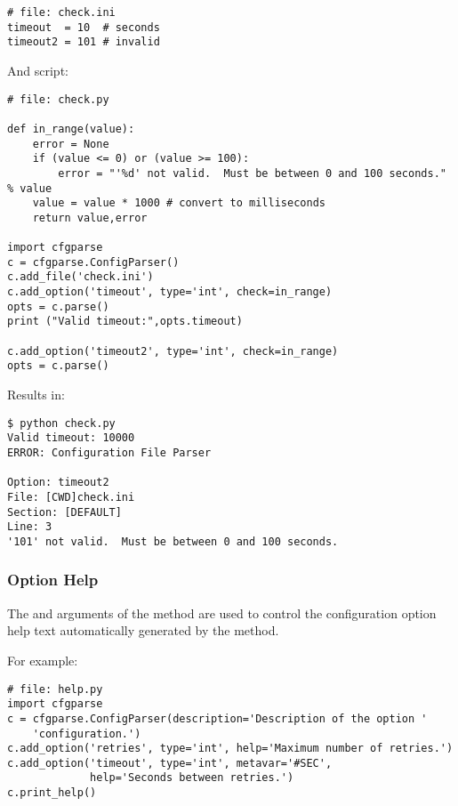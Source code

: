 \documentclass{howto}
\begin{document}
\begin{verbatim}
# file: check.ini
timeout  = 10  # seconds
timeout2 = 101 # invalid
\end{verbatim}

And script:

\begin{verbatim}
# file: check.py

def in_range(value):
    error = None
    if (value <= 0) or (value >= 100):
        error = "'%d' not valid.  Must be between 0 and 100 seconds." % value        
    value = value * 1000 # convert to milliseconds
    return value,error
    
import cfgparse
c = cfgparse.ConfigParser()
c.add_file('check.ini')
c.add_option('timeout', type='int', check=in_range)
opts = c.parse()
print ("Valid timeout:",opts.timeout)

c.add_option('timeout2', type='int', check=in_range)
opts = c.parse()
\end{verbatim}

Results in:
\begin{verbatim}
$ python check.py
Valid timeout: 10000
ERROR: Configuration File Parser

Option: timeout2
File: [CWD]check.ini
Section: [DEFAULT]
Line: 3
'101' not valid.  Must be between 0 and 100 seconds.
\end{verbatim}
 
\subsubsection{Option Help\label{cfgparse-option-help}}

The  and  arguments of the  method 
are used to control the configuration option help text automatically generated 
by the  method.

For example:

\begin{verbatim}
# file: help.py
import cfgparse
c = cfgparse.ConfigParser(description='Description of the option '
    'configuration.')
c.add_option('retries', type='int', help='Maximum number of retries.')
c.add_option('timeout', type='int', metavar='#SEC', 
             help='Seconds between retries.')
c.print_help()
\end{verbatim}
\end{document}
